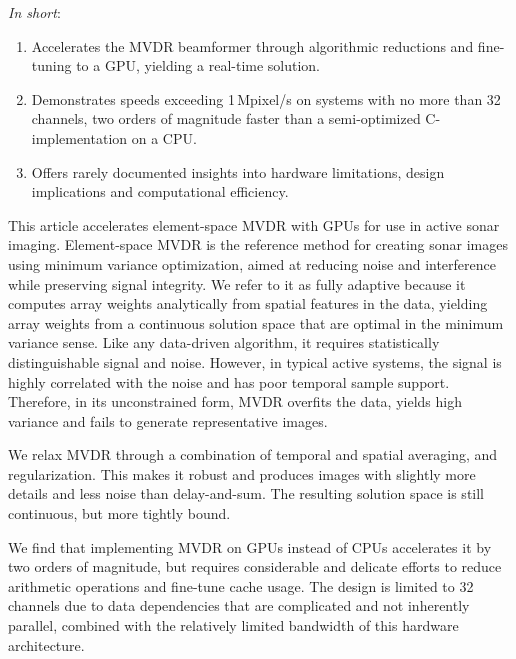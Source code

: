 \textit{In short}:
\begin{enumerate}
\item Accelerates the MVDR beamformer through algorithmic reductions and fine-tuning to a GPU, yielding a real-time solution.
\item Demonstrates speeds exceeding 1\,Mpixel/s on systems with no more than 32 channels, two orders of magnitude faster than a semi-optimized C-implementation on a CPU.
\item Offers rarely documented insights into hardware limitations, design implications and computational efficiency.
\end{enumerate}

This article accelerates element-space MVDR with GPUs for use in active sonar imaging. Element-space MVDR is the reference method for creating sonar images using minimum variance optimization, aimed at reducing noise and interference while preserving signal integrity. We refer to it as fully adaptive because it computes array weights analytically from spatial features in the data, yielding array weights from a continuous solution space that are optimal in the minimum variance sense. Like any data-driven algorithm, it requires statistically distinguishable signal and noise. However, in typical active systems, the signal is highly correlated with the noise and has poor temporal sample support. Therefore, in its unconstrained form, MVDR overfits the data, yields high variance and fails to generate representative images.

We relax MVDR through a combination of temporal and spatial averaging, and regularization. This makes it robust and produces images with slightly more details and less noise than delay-and-sum. The resulting solution space is still continuous, but more tightly bound.

We find that implementing MVDR on GPUs instead of CPUs accelerates it by two orders of magnitude, but requires considerable and delicate efforts to reduce arithmetic operations and fine-tune cache usage. The design is limited to 32 channels due to data dependencies that are complicated and not inherently parallel, combined with the relatively limited bandwidth of this hardware architecture. 


